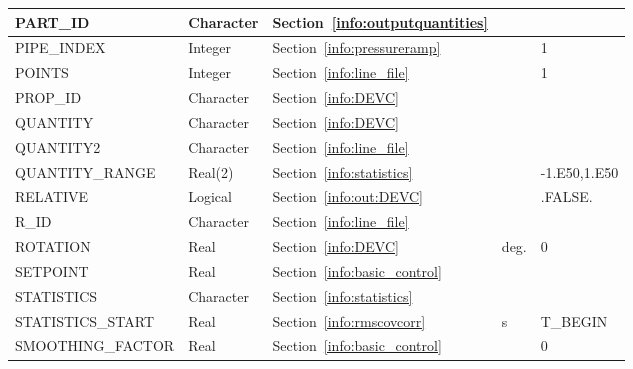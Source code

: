 \documentclass[11pt]{book}
\begin{document}
\begin{longtable}{@{\extracolsep{\fill}}|l|l|l|l|l|}
{\ct PART\_ID}              & Character       & Section~\ref{info:outputquantities}                             &       &               \\ \hline
{\ct PIPE\_INDEX}           & Integer         & Section~\ref{info:pressureramp}                                 &       &  1            \\ \hline
{\ct POINTS}                & Integer         & Section~\ref{info:line_file}                                    &       & 1             \\ \hline
{\ct PROP\_ID}              & Character       & Section~\ref{info:DEVC}                                         &       &               \\ \hline
{\ct QUANTITY}              & Character       & Section~\ref{info:DEVC}                                         &       &               \\ \hline
{\ct QUANTITY2}             & Character       & Section~\ref{info:line_file}                                    &       &               \\ \hline
{\ct QUANTITY\_RANGE}       & Real(2)         & Section~\ref{info:statistics}                                   &       & -1.E50,1.E50  \\ \hline
{\ct RELATIVE}              & Logical         & Section~\ref{info:out:DEVC}                                     &       & {\ct .FALSE.} \\ \hline
{\ct R\_ID}                 & Character       & Section~\ref{info:line_file}                                    &       &               \\ \hline
{\ct ROTATION}              & Real            & Section~\ref{info:DEVC}                                         & deg.  & 0             \\ \hline
{\ct SETPOINT}              & Real            & Section~\ref{info:basic_control}                                &       &               \\ \hline
{\ct STATISTICS}            & Character       & Section~\ref{info:statistics}                                   &       &               \\ \hline
{\ct STATISTICS\_START}     & Real            & Section~\ref{info:rmscovcorr}                                   & s     & {\ct T\_BEGIN}\\ \hline
{\ct SMOOTHING\_FACTOR}     & Real            & Section~\ref{info:basic_control}                                &       & 0             \\ \hline

\end{longtable}
\end{document}
